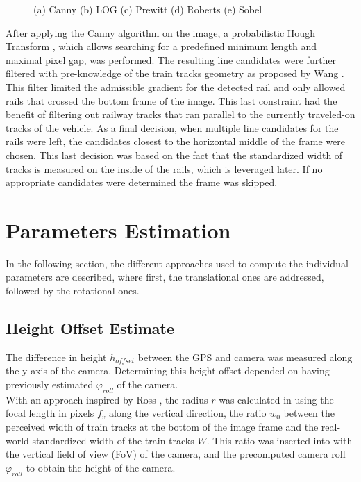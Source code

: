 \begin{figure}[h]
    \centering
    \caption{(a) Canny (b) LOG (c) Prewitt (d) Roberts (e) Sobel}
    \label{pics:edge_detect}
\end{figure}


After applying the Canny algorithm on the image, a probabilistic Hough Transform \citep{matas2000robust}, which allows searching for a predefined minimum length and maximal pixel gap, was performed. The resulting line candidates were further filtered with pre-knowledge of the train tracks geometry as proposed by Wang \citep{wang2015inverse}. This filter limited the admissible gradient for the detected rail and only allowed rails that crossed the bottom frame of the image. This last constraint had the benefit of filtering out railway tracks that ran parallel to the currently traveled-on tracks of the vehicle. As a final decision, when multiple line candidates for the rails were left, the candidates closest to the horizontal middle of the frame were chosen. This last decision was based on the fact that the standardized width of tracks is measured on the inside of the rails, which is leveraged later. If no appropriate candidates were determined the frame was skipped.
\newpage






\section{Parameters Estimation}
In the following section, the different approaches used to compute the individual parameters are described, where first, the translational ones are addressed, followed by the rotational ones.

\subsection{Height Offset Estimate}
The difference in height $h_{offset}$ between the GPS and camera was measured along the y-axis of the camera. Determining this height offset depended on having previously estimated $\varphi_{roll}$ of the camera. \\

With an approach inspired by Ross \citep{ross2010vision}, the radius $r$ was calculated in  using the focal length in pixels $f_v$ along the vertical direction, the ratio $w_0$ between the perceived width of train tracks at the bottom of the image frame and the real-world standardized width of the train tracks $W$. This ratio was inserted into  with the vertical field of view (FoV) of the camera, and the precomputed camera roll $\varphi_{roll}$ to obtain the height of the camera.

